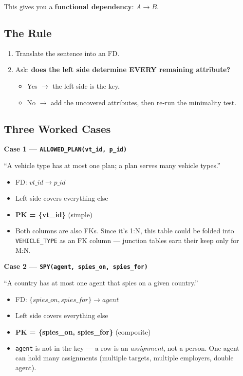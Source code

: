 \documentclass[12pt]{article}
\begin{document}
This gives you a \textbf{functional dependency}: $A \to B$.

\subsection*{The Rule}

\begin{enumerate}
    \item Translate the sentence into an FD.
    \item Ask: \textbf{does the left side determine EVERY remaining attribute?}
    \begin{itemize}
        \item Yes $\to$ the left side is the key.
        \item No $\to$ add the uncovered attributes, then re-run the minimality test.
    \end{itemize}
\end{enumerate}

\subsection*{Three Worked Cases}

\textbf{Case 1 --- \texttt{ALLOWED\_PLAN(vt\_id, p\_id)}}

``A vehicle type has at most one plan; a plan serves many vehicle types.''
\begin{itemize}
    \item FD: $vt\_id \to p\_id$
    \item Left side covers everything else \checkmark
    \item \textbf{PK = \{vt\_id\}} (simple)
    \item Both columns are also FKs. Since it's 1:N, this table could be folded
    into \texttt{VEHICLE\_TYPE} as an FK column --- junction tables earn their
    keep only for M:N.
\end{itemize}

\textbf{Case 2 --- \texttt{SPY(agent, spies\_on, spies\_for)}}

``A country has at most one agent that spies on a given country.''
\begin{itemize}
    \item FD: $\{spies\_on, spies\_for\} \to agent$
    \item Left side covers everything else \checkmark
    \item \textbf{PK = \{spies\_on, spies\_for\}} (composite)
    \item \texttt{agent} is not in the key --- a row is an \emph{assignment}, not
    a person. One agent can hold many assignments (multiple targets, multiple
    employers, double agent).
\end{itemize}
\end{document}
